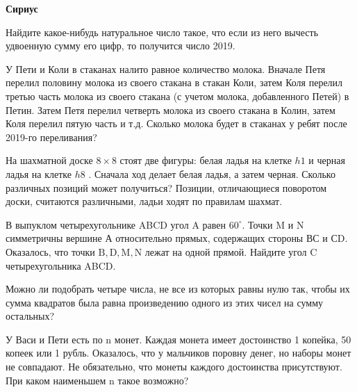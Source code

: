 \centerline{\bf \Huge Сириус}


Найдите какое-нибудь натуральное число такое, что если из него вычесть удвоенную сумму его цифр, то получится число 2019.

У Пети и Коли в стаканах налито равное количество молока. Вначале Петя перелил половину молока из своего стакана в стакан Коли, затем Коля перелил третью часть молока из своего стакана (с учетом молока, добавленного Петей) в Петин. Затем Петя перелил четверть молока из своего стакана в Колин, затем Коля перелил пятую часть и т.д. Сколько молока будет в стаканах у ребят после 2019-го переливания?

На шахматной доске $8 \times 8$ стоят две фигуры: белая ладья на клетке $h1$ и черная ладья на клетке $h8$ . Сначала ход делает белая ладья, а затем черная. Сколько различных позиций может получиться? Позиции, отличающиеся поворотом доски, считаются различными, ладьи ходят по правилам шахмат.

В выпуклом четырехугольнике ABCD угол A равен $60^{\circ}$. Точки M и N симметричны вершине А относительно прямых, содержащих стороны ВС и СD. Оказалось, что точки $\mathrm{B}, \mathrm{D}, \mathrm{M}, \mathrm{N}$ лежат на одной прямой. Найдите угол C четырехугольника ABCD.

Можно ли подобрать четыре числа, не все из которых равны нулю так, чтобы их сумма квадратов была равна произведению одного из этих чисел на сумму остальных?

У Васи и Пети есть по n монет. Каждая монета имеет достоинство 1 копейка, 50 копеек или 1 рубль. Оказалось, что у мальчиков поровну денег, но наборы монет не совпадают. Не обязательно, что монеты каждого достоинства присутствуют. При каком наименьшем n такое возможно?